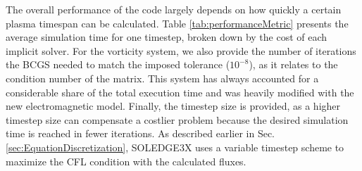 The overall performance of the code largely depends on how quickly a certain plasma timespan can be calculated. Table \ref{tab:performanceMetric} presents the average simulation time for one timestep, broken down by the cost of each implicit solver. For the vorticity system, we also provide the number of iterations the BCGS needed to match the imposed tolerance ($10^{-8}$), as it relates to the condition number of the matrix. This system has always accounted for a considerable share of the total execution time and was heavily modified with the new electromagnetic model. Finally, the timestep size is provided, as a higher timestep size can compensate a costlier problem because the desired simulation time is reached in fewer iterations. As described earlier in Sec. \ref{sec:EquationDiscretization}, SOLEDGE3X uses a variable timestep scheme to maximize the CFL condition with the calculated fluxes. \newline

\begin{table}[h!]
	\centering
	\caption{Numerical metrics on the four TCV scenarios for one timestep. All quantities are averaged over the last 20000 timesteps of the simulation. The execution time refers to the wall-clock time and must be multiplied by the number of used processors (768) to get the actual used CPU time.}
	\label{tab:performanceMetric}
\end{table}

